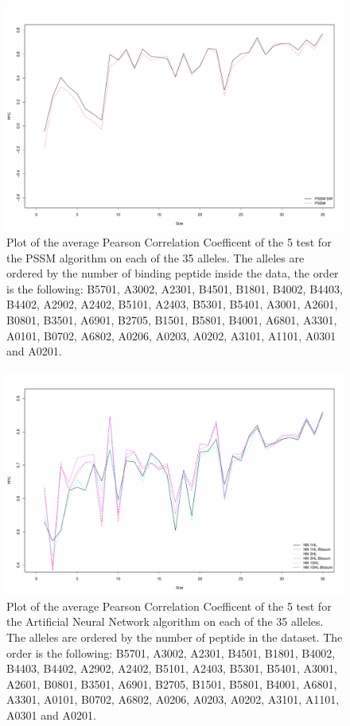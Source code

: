 \begin{figure}[ht]
\begin{center}
\includegraphics[width=18cm]{fig/pssmLN1.pdf}
\caption{Plot of the average Pearson Correlation Coefficent of the 5 test for the PSSM algorithm on each of the 35 alleles. The alleles are ordered by the number of binding peptide inside the data, the order is the following:
B5701, A3002, A2301, B4501, B1801, B4002, B4403, B4402, A2902, A2402, B5101, A2403, B5301, B5401, A3001, A2601, B0801, B3501, A6901, B2705, B1501, B5801, B4001, A6801, A3301, A0101, B0702, A6802, A0206, A0203, A0202, A3101, A1101, A0301 and A0201.}\label{fig:pssm1}
\end{center}
\end{figure}

\begin{figure}[ht]
\begin{center}
\includegraphics[width=18cm]{fig/annLNzoom.pdf}
\caption{Plot of the average Pearson Correlation Coefficent of the 5 test for the Artificial Neural Network algorithm on each of the 35 alleles. The alleles are ordered by the number of peptide in the dataset. The order is the following:
B5701, A3002, A2301, B4501, B1801, B4002, B4403, B4402, A2902, A2402, B5101, A2403, B5301, B5401, A3001, A2601, B0801, B3501, A6901, B2705, B1501, B5801, B4001, A6801, A3301, A0101, B0702, A6802, A0206, A0203, A0202, A3101, A1101, A0301 and A0201.}\label{fig:ann1}
\end{center}
\end{figure}

